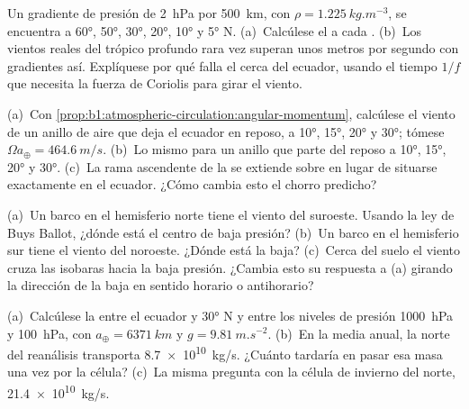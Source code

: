 \begin{exercise}[$\star\star$]\label{exo:b1:atmospheric-circulation:5}
Un gradiente de presión de \qty{2}{hPa} por \qty{500}{km}, con $\rho =
\qty{1.225}{kg.m^{-3}}$, se encuentra a \ang{60}, \ang{50}, \ang{30}, \ang{20},
\ang{10} y \ang{5} N. (a)~Calcúlese el  a cada . (b)~Los vientos reales del trópico profundo rara vez superan unos metros por segundo con gradientes así. Explíquese por qué falla el  cerca del ecuador, usando el tiempo $1/f$ que necesita la fuerza de Coriolis para girar el viento.
\end{exercise}

\begin{exercise}[$\star\star$]\label{exo:b1:atmospheric-circulation:6}
(a)~Con \cref{prop:b1:atmospheric-circulation:angular-momentum}, calcúlese el viento de un anillo de aire que deja el ecuador en reposo, a \ang{10}, \ang{15}, \ang{20} y
\ang{30}; tómese $\Omega a_\oplus = \qty{464.6}{m/s}$. (b)~Lo mismo para un anillo que parte del reposo a \ang{10}, \ang{15}, \ang{20} y \ang{30}. (c)~La rama ascendente de la  se extiende sobre  en lugar de situarse exactamente en el ecuador. ¿Cómo cambia esto el chorro predicho?
\end{exercise}

\begin{exercise}[$\star\star$]\label{exo:b1:atmospheric-circulation:7}
(a)~Un barco en el hemisferio norte tiene el viento del suroeste. Usando la ley de Buys Ballot, ¿dónde está el centro de baja presión? (b)~Un barco en el hemisferio sur tiene el viento del noroeste. ¿Dónde está la baja? (c)~Cerca del suelo el viento cruza las isobaras hacia la baja presión. ¿Cambia esto su respuesta a (a) girando la dirección de la baja en sentido horario o antihorario?
\end{exercise}

\begin{exercise}[$\star\star$]\label{exo:b1:atmospheric-circulation:8}
(a)~Calcúlese la  entre el ecuador y \ang{30} N y entre los niveles de presión \qty{1000}{hPa} y \qty{100}{hPa}, con $a_\oplus = \qty{6371}{km}$ y $g = \qty{9.81}{m.s^{-2}}$. (b)~En la media anual, la  norte del reanálisis transporta \qty{8.7e10}{kg/s}. ¿Cuánto tardaría en pasar esa masa una vez por la célula? (c)~La misma pregunta con la célula de invierno del norte, \qty{21.4e10}{kg/s}.
\end{exercise}

